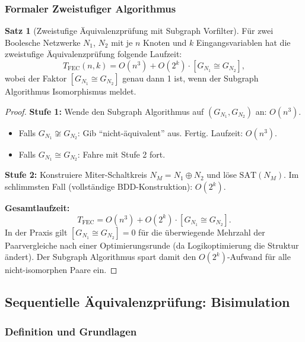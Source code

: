 ﻿\documentclass[a4paper,12pt]{article}
\theoremstyle{definition}
\newtheorem{satz}{Satz}
\begin{document}
\subsubsection{Formaler Zweistufiger Algorithmus}

\begin{satz}[Zweistufige Äquivalenzprüfung mit Subgraph Vorfilter]\label{satz:zweistufen}
  Für zwei Boolesche Netzwerke $N_1$, $N_2$ mit je $n$ Knoten und $k$ Eingangsvariablen
  hat die zweistufige Äquivalenzprü\-fung folgende Laufzeit:
  \[
    T_{\text{FEC}}(n, k) = O(n^3) + O(2^k) \cdot [G_{N_1} \cong G_{N_2}],
  \]
  wobei der Faktor $[G_{N_1} \cong G_{N_2}]$ genau dann 1 ist, wenn der Subgraph
  Algorithmus Isomorphismus meldet.
\end{satz}

\begin{proof}
  \textbf{Stufe 1:} Wende den Subgraph Algorithmus auf $(G_{N_1}, G_{N_2})$ an: $O(n^3)$.
  \begin{itemize}
    \item Falls $G_{N_1} \not\cong G_{N_2}$: Gib ``nicht-äquivalent'' aus. Fertig.
          Laufzeit: $O(n^3)$.
    \item Falls $G_{N_1} \cong G_{N_2}$: Fahre mit Stufe 2 fort.
  \end{itemize}

  \textbf{Stufe 2:} Konstruiere Miter-Schaltkreis $N_M = N_1 \oplus N_2$ und löse
  $\text{SAT}(N_M)$. Im schlimmsten Fall (vollständige BDD-Konstruktion): $O(2^k)$.

  \textbf{Gesamtlaufzeit:}
  \[
    T_{\text{FEC}} = O(n^3) + O(2^k) \cdot [G_{N_1} \cong G_{N_2}].
  \]
  In der Praxis gilt $[G_{N_1} \cong G_{N_2}] = 0$ für die überwiegende Mehrzahl der
  Paarvergleiche nach einer Optimierungsrunde (da Logikoptimierung die Struktur ändert).
  Der Subgraph Algorithmus spart damit den $O(2^k)$-Aufwand für alle nicht-isomorphen
  Paare ein.
\end{proof}

\subsection{Sequentielle Äquivalenzprüfung: Bisimulation}

\subsubsection{Definition und Grundlagen}
\end{document}

